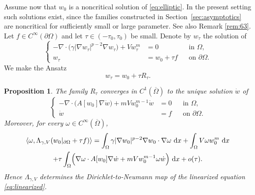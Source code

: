 \documentclass[a4paper,12pt]{article}
\newcommand{\la}{\langle}
\newcommand{\ra}{\rangle}
\newcommand{\pr}{\partial}
\newcommand{\dd}{\,\mathrm{d}}
\newtheorem{prop}[thm]{Proposition}
\theoremstyle{definition}
\theoremstyle{remark}
\begin{document}
Assume now that $w_0$ is a noncritical solution of \eqref{eq:elliptic}. In the present setting such solutions exist, since the families constructed in Section~\ref{sec:asymptotics} are noncritical for sufficiently small or large parameter. See also Remark \ref{rem:63}. Let $f\in C^\infty(\pr\Omega)$ and let $\tau\in(-\tau_0,\tau_0)$ be small. Denote by $w_\tau$ the solution of
\begin{equation}\label{eq:w-tau}
\left\{
\begin{aligned}
-\nabla\cdot\bigl(\gamma|\nabla w_\tau|^{p-2}\nabla w_\tau\bigr)+Vw_\tau^m&=0 &&\text{in }\Omega,\\
 w_\tau&=w_0+\tau f &&\text{on }\pr\Omega.
\end{aligned}
\right.
\end{equation}
We make the Ansatz
\[
w_\tau=w_0+\tau R_\tau.
\]

\begin{prop}\label{prop:linearization}
The family $R_\tau$ converges in $C^1(\overline\Omega)$ to the unique solution $\dot w$ of
\begin{equation}\label{eq:linearized}
\left\{
\begin{aligned}
-\nabla\cdot\bigl(A[w_0]\nabla \dot w\bigr)+mVw_0^{m-1}\dot w&=0 &&\text{in }\Omega,\\
\dot w&=f &&\text{on }\pr\Omega.
\end{aligned}
\right.
\end{equation}
Moreover, for every $\omega\in C^\infty(\overline\Omega)$,
\begin{multline}\label{eq:expansion-mid}
\la \omega,\Lambda_{\gamma,V}(w_0|_{\pr\Omega}+\tau f)\ra
=
\int_\Omega\gamma|\nabla w_0|^{p-2}\nabla w_0\cdot\nabla\omega\,\dd x+
\int_\Omega V\omega w_0^m\,\dd x\\
+\tau\int_\Omega\Bigl(\nabla\omega\cdot A[w_0]\nabla\dot w+mVw_0^{m-1}\omega\dot w\Bigr)\,\dd x+o(\tau).
\end{multline}
Hence $\Lambda_{\gamma,V}$ determines the Dirichlet-to-Neumann map of the linearized equation \eqref{eq:linearized}.
\end{prop}
\end{document}
